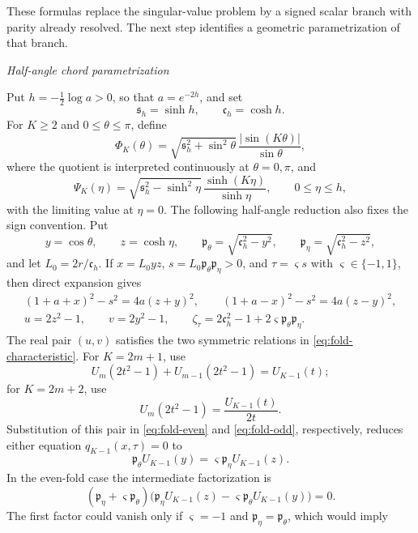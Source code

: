 \documentclass[a4paper,preprint,12pt,nopreprintline,sort&compress]{elsarticle}
\numberwithin{equation}{section}
\theoremstyle{remark}
\newcommand{\proofstage}[1]{%
  \par\medskip\noindent\textit{#1}\par\nobreak\smallskip}
\begin{document}
These formulas replace the singular-value problem by a signed scalar branch
with parity already resolved.  The next step identifies a geometric
parametrization of that branch.

\proofstage{Half-angle chord parametrization}
Put \(h=-\tfrac12\log a>0\), so that \(a=e^{-2h}\), and set
\[
 \mathfrak s_h=\sinh h,\qquad \mathfrak c_h=\cosh h.
\]
For \(K\geq2\) and \(0\leq\theta\leq\pi\), define
\begin{equation}\label{eq:Phi-Psi-def}
 \Phi_K(\theta)=\sqrt{\mathfrak s_h^2+\sin^2\theta}\,
 \frac{|\sin(K\theta)|}{\sin\theta},
\end{equation}
where the quotient is interpreted continuously at \(\theta=0,\pi\),
and
\[
 \Psi_K(\eta)=\sqrt{\mathfrak s_h^2-\sinh^2\eta}\,
 \frac{\sinh(K\eta)}{\sinh\eta},\qquad0\leq\eta\leq h,
\]
with the limiting value at \(\eta=0\).  The following half-angle reduction
also fixes the sign convention.  Put
\[
 y=\cos\theta,\qquad z=\cosh\eta,\qquad
 \mathfrak p_\theta=\sqrt{\mathfrak c_h^2-y^2},\qquad
 \mathfrak p_\eta=\sqrt{\mathfrak c_h^2-z^2},
\]
and let \(L_0=2r/\mathfrak c_h\).  If
\(x=L_0yz\), \(s=L_0\mathfrak p_\theta\mathfrak p_\eta>0\), and
\(\tau=\varsigma s\) with \(\varsigma\in\{-1,1\}\), then direct
expansion gives
\begin{equation}\label{eq:half-variable-identities}
\begin{gathered}
 (1+a+x)^2-s^2=4a(z+y)^2,\qquad
 (1+a-x)^2-s^2=4a(z-y)^2,\\
 u=2z^2-1,\qquad v=2y^2-1,\qquad
 \zeta_\tau=2\mathfrak c_h^2-1
 +2\varsigma\mathfrak p_\theta\mathfrak p_\eta.
\end{gathered}
\end{equation}
The real pair \((u,v)\) satisfies the two symmetric relations in
\eqref{eq:fold-characteristic}.
For \(K=2m+1\), use
\[
 U_m(2t^2-1)+U_{m-1}(2t^2-1)=U_{K-1}(t);
\]
for \(K=2m+2\), use
\[
 U_m(2t^2-1)=\frac{U_{K-1}(t)}{2t}.
\]
Substitution of this pair in \eqref{eq:fold-even} and
\eqref{eq:fold-odd}, respectively, reduces either equation
\(q_{K-1}(x,\tau)=0\) to
\begin{equation}\label{eq:signed-half-chord}
 \mathfrak p_\theta U_{K-1}(y)
 =\varsigma\mathfrak p_\eta U_{K-1}(z).
\end{equation}
In the even-fold case the intermediate factorization is
\[
 (\mathfrak p_\eta+\varsigma\mathfrak p_\theta)
 \bigl(\mathfrak p_\eta U_{K-1}(z)
 -\varsigma\mathfrak p_\theta U_{K-1}(y)\bigr)=0.
\]
The first factor could vanish only if \(\varsigma=-1\) and
\(\mathfrak p_\eta=\mathfrak p_\theta\), which would imply
\end{document}
